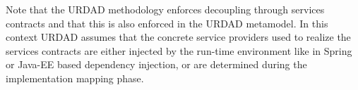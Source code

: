 Note that the URDAD methodology enforces decoupling through services contracts and that this is also enforced in the URDAD metamodel. In this context URDAD assumes that the concrete service providers used to realize the services contracts are either injected by the run-time environment like in Spring or Java-EE based dependency injection, or are determined during the implementation mapping phase.


